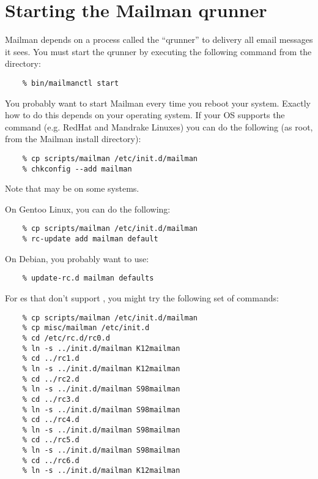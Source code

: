 \documentclass{howto}
\begin{document}
\section{Starting the Mailman qrunner}

Mailman depends on a process called the ``qrunner'' to delivery all
email messages it sees.  You must start the qrunner by executing the following
command from the  directory:

\begin{verbatim}
    % bin/mailmanctl start
\end{verbatim}

You probably want to start Mailman every time you reboot your system.  Exactly
how to do this depends on your operating system.  If your OS supports the
 command (e.g. RedHat and Mandrake Linuxes) you can
do the following (as root, from the Mailman install directory):

\begin{verbatim}
    % cp scripts/mailman /etc/init.d/mailman
    % chkconfig --add mailman
\end{verbatim}

Note that  may be  on some systems.

On Gentoo Linux, you can do the following:

\begin{verbatim}
    % cp scripts/mailman /etc/init.d/mailman
    % rc-update add mailman default
\end{verbatim}

On Debian, you probably want to use:

\begin{verbatim}
    % update-rc.d mailman defaults
\end{verbatim}

For \UNIX{}es that don't support , you might try the
following set of commands:

\begin{verbatim}
    % cp scripts/mailman /etc/init.d/mailman
    % cp misc/mailman /etc/init.d
    % cd /etc/rc.d/rc0.d
    % ln -s ../init.d/mailman K12mailman
    % cd ../rc1.d
    % ln -s ../init.d/mailman K12mailman
    % cd ../rc2.d
    % ln -s ../init.d/mailman S98mailman
    % cd ../rc3.d
    % ln -s ../init.d/mailman S98mailman
    % cd ../rc4.d
    % ln -s ../init.d/mailman S98mailman
    % cd ../rc5.d
    % ln -s ../init.d/mailman S98mailman
    % cd ../rc6.d
    % ln -s ../init.d/mailman K12mailman
\end{verbatim}
\end{document}
